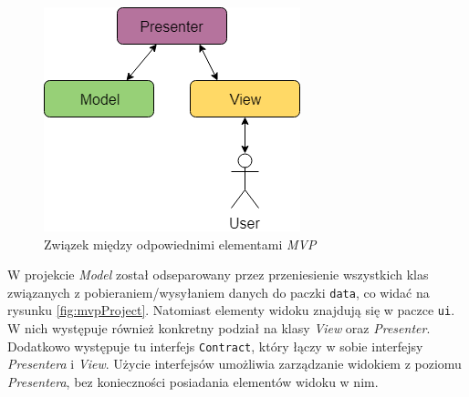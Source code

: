 \documentclass[twoside]{projektInzynierskiMS}
\begin{document}
\begin{figure}[h]
  \centering
  \includegraphics[width=0.5\linewidth]{img/android/mvp.png}
  \caption{Związek między odpowiednimi elementami \textit{MVP}}
  \label{fig:mvp}
\end{figure}

W projekcie \textit{Model} został odseparowany przez przeniesienie wszystkich klas związanych z pobieraniem/wysyłaniem danych do paczki \verb`data`, co widać na rysunku \ref{fig:mvpProject}. Natomiast elementy widoku znajdują się w paczce \verb`ui`. W nich występuje również konkretny podział na klasy \textit{View} oraz \textit{Presenter}. Dodatkowo występuje tu interfejs \verb`Contract`, który łączy w sobie interfejsy \textit{Presentera} i \textit{View}. Użycie interfejsów umożliwia zarządzanie widokiem z poziomu \textit{Presentera}, bez konieczności posiadania elementów widoku w nim. 
\end{document}
